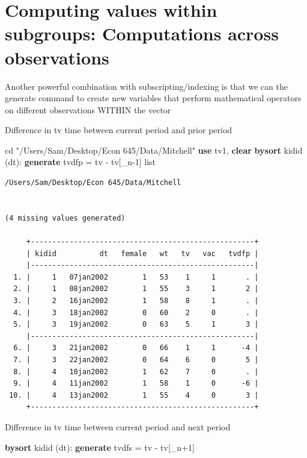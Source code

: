 \documentclass[
]{book}
\newenvironment{Shaded}{\begin{snugshade}}{\end{snugshade}}
\newcommand{\DataTypeTok}[1]{\textcolor[rgb]{0.13,0.29,0.53}{#1}}
\newcommand{\KeywordTok}[1]{\textcolor[rgb]{0.13,0.29,0.53}{\textbf{#1}}}
\newcommand{\NormalTok}[1]{#1}
\newcommand{\OtherTok}[1]{\textcolor[rgb]{0.56,0.35,0.01}{#1}}
\newcommand{\StringTok}[1]{\textcolor[rgb]{0.31,0.60,0.02}{#1}}
\begin{document}
\section{Computing values within subgroups: Computations across observations}\label{computing-values-within-subgroups-computations-across-observations}

Another powerful combination with subscripting/indexing is that we can the
generate command to create new variables that perform mathematical operators
on different observations WITHIN the vector

Difference in tv time between current period and prior period

\begin{Shaded}
\begin{Highlighting}[]
\NormalTok{cd }\StringTok{"/Users/Sam/Desktop/Econ 645/Data/Mitchell"}
\KeywordTok{use}\NormalTok{ tv1, }\KeywordTok{clear}
\KeywordTok{bysort}\NormalTok{ kidid (dt): }\KeywordTok{generate}\NormalTok{ tvdfp = tv {-} tv[}\DataTypeTok{\_n}\NormalTok{{-}1]}
\OtherTok{list}
\end{Highlighting}
\end{Shaded}

\begin{verbatim}
/Users/Sam/Desktop/Econ 645/Data/Mitchell


(4 missing values generated)

     +----------------------------------------------------+
     | kidid          dt   female   wt   tv   vac   tvdfp |
     |----------------------------------------------------|
  1. |     1   07jan2002        1   53    1     1       . |
  2. |     1   08jan2002        1   55    3     1       2 |
  3. |     2   16jan2002        1   58    8     1       . |
  4. |     3   18jan2002        0   60    2     0       . |
  5. |     3   19jan2002        0   63    5     1       3 |
     |----------------------------------------------------|
  6. |     3   21jan2002        0   66    1     1      -4 |
  7. |     3   22jan2002        0   64    6     0       5 |
  8. |     4   10jan2002        1   62    7     0       . |
  9. |     4   11jan2002        1   58    1     0      -6 |
 10. |     4   13jan2002        1   55    4     0       3 |
     +----------------------------------------------------+
\end{verbatim}

Difference in tv time between current period and next period

\begin{Shaded}
\begin{Highlighting}[]
\KeywordTok{bysort}\NormalTok{ kidid (dt): }\KeywordTok{generate}\NormalTok{ tvdfs = tv {-} tv[}\DataTypeTok{\_n}\NormalTok{+1]}
\end{Highlighting}
\end{Shaded}
\end{document}
